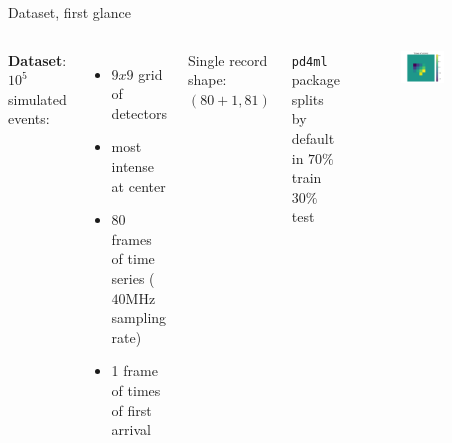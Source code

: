 \documentclass{beamer}
\begin{document}
\begin{frame}{Dataset, first glance}

    \begin{columns}
    
    \textbf{Dataset}: $10^5$ simulated events:
    \vspace{5 pt}

    \begin{itemize}
        \item[\textbullet] $9 x 9$ grid of detectors
        \item[\textbullet] most intense at center 
        \item[\textbullet] 80 frames of time series ($40$MHz sampling rate)
        \item[\textbullet] 1 frame of times of first arrival 
    \end{itemize}
    \vspace{10 pt}

    Single record shape: $(80 + 1 , 81)$\\
    \vspace{15 pt}

    \texttt{pd4ml} package splits by default in $70\%$ train $30\%$ test
    
    
        \begin{figure}
            \centering
            \includegraphics[width=0.6\textwidth]{figures/times_of_arrival.pdf}
        \end{figure}
        

\end{columns}
\end{frame}
\end{document}
